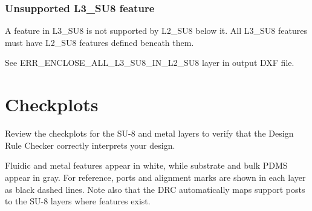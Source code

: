 \documentclass[twoside]{article}
\begin{document}
\subsubsection{Unsupported L3\_SU8 feature}
\par A feature in L3\_SU8 is not supported by L2\_SU8 below it. All L3\_SU8
features must have L2\_SU8 features defined beneath them.  \par See
ERR\_ENCLOSE\_ALL\_L3\_SU8\_IN\_L2\_SU8 layer in output DXF file.

\section{Checkplots}
Review the checkplots for the SU-8 and metal layers to verify that the Design
Rule Checker correctly interprets your design.  \par Fluidic and metal features
appear in white, while substrate and bulk PDMS appear in gray. For reference,
ports and alignment marks are shown in each layer as black dashed lines. Note
also that the DRC automatically maps support posts to the SU-8 layers where
features exist.
\end{document}
